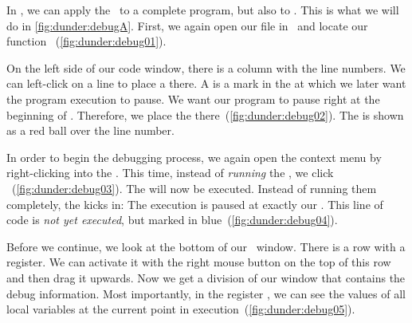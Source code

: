 %
In \pycharm, we can apply the \debugger\ to a complete program, but also to .
This is what we will do in \cref{fig:dunder:debugA}.
First, we again open our file  in \pycharm\ and locate our function ~(\cref{fig:dunder:debug01}).

On the left side of our code window, there is a column with the line numbers.
We can left-click on a line to place a  there.
A  is a mark in the  at which we later want the program execution to pause.
We want our program to pause right at the beginning of .
Therefore, we place the  there~(\cref{fig:dunder:debug02}).
The  is shown as a red ball over the line number.

In order to begin the debugging process, we again open the context menu by right-clicking into the .
This time, instead of \emph{running} the , we click ~(\cref{fig:dunder:debug03}).
The  will now be executed.
Instead of running them completely, the  kicks in:
The execution is paused at exactly our .
This line of code is \emph{not yet executed}, but marked in blue~(\cref{fig:dunder:debug04}).

Before we continue, we look at the bottom of our \pycharm\ window.
There is a row with a  register.
We can activate it with the right mouse button on the top of this row and then drag it upwards.
Now we get a division of our window that contains the debug information.
Most importantly, in the register , we can see the values of all local variables at the current point in execution~(\cref{fig:dunder:debug05}).

